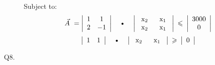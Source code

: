 \documentclass[10pt]{csc_assignment}
\begin{document}
\begin{description}
Subject to: \\

\[\text{$\vec{A}$ } = \left| \begin{array}{cc}
1 & 1  \\
2 & -1 \end{array} \right|
\text{~~~\textbullet ~~~}
\left| \begin{array}{cc}
\text{ x$_{2}$ } & \text{ x$_{1}$ }  \\
\text{ x$_{2}$ } & \text{ x$_{1}$ } \end{array} \right|
\text{ $\leqslant$ }
\left| \begin{array}{c}
3000  \\
0 \end{array} \right|
 \] 
\[ \left| \begin{array}{cc}
1 & 1  \end{array} \right|
\text{~~~\textbullet ~~~}
\left| \begin{array}{cc}
\text{ x$_{2}$ } & \text{ x$_{1}$ }  \end{array} \right|
\text{ $\geqslant$ }
\left| \begin{array}{c}
0 \end{array} \right|
 \] 



\newpage
\item[Q8.]

\end{description}
\end{document}
